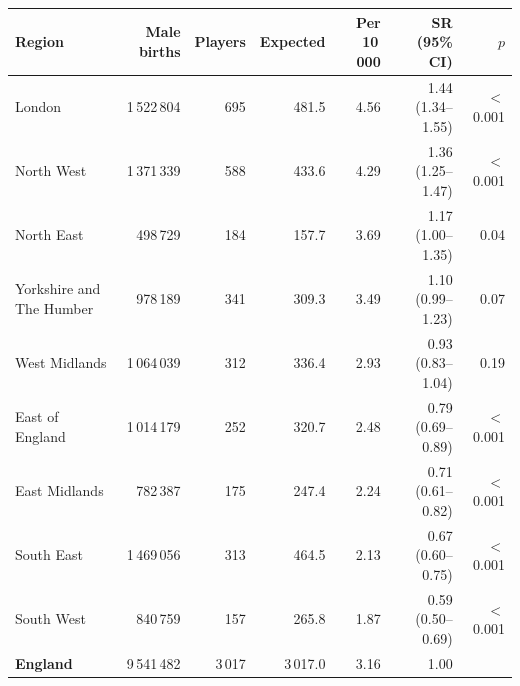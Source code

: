 \begin{tabular}{lrrrrrr}
\toprule
Region & Male births & Players & Expected & Per 10\,000 & SR (95\% CI) & $p$
\\
\midrule
London & 1\,522\,804 & 695 & 481.5 & 4.56 & 1.44 (1.34--1.55) & $<$0.001 \\
North West & 1\,371\,339 & 588 & 433.6 & 4.29 & 1.36 (1.25--1.47) & $<$0.001 \\
North East & 498\,729 & 184 & 157.7 & 3.69 & 1.17 (1.00--1.35) & 0.04 \\
Yorkshire and The Humber & 978\,189 & 341 & 309.3 & 3.49 & 1.10 (0.99--1.23) & 0.07 \\
West Midlands & 1\,064\,039 & 312 & 336.4 & 2.93 & 0.93 (0.83--1.04) & 0.19 \\
East of England & 1\,014\,179 & 252 & 320.7 & 2.48 & 0.79 (0.69--0.89) & $<$0.001 \\
East Midlands & 782\,387 & 175 & 247.4 & 2.24 & 0.71 (0.61--0.82) & $<$0.001 \\
South East & 1\,469\,056 & 313 & 464.5 & 2.13 & 0.67 (0.60--0.75) & $<$0.001 \\
South West & 840\,759 & 157 & 265.8 & 1.87 & 0.59 (0.50--0.69) & $<$0.001 \\
\textbf{England} & 9\,541\,482 & 3\,017 & 3\,017.0 & 3.16 & 1.00 &  \\
\bottomrule
\end{tabular}
